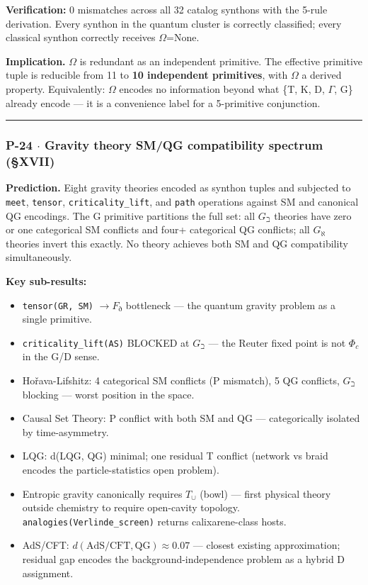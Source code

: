 \documentclass[12pt,a4paper]{article}
\begin{document}
\textbf{Verification:} 0 mismatches across all 32 catalog synthons with the 5-rule derivation. Every synthon in the quantum cluster is correctly classified; every classical synthon correctly receives $\Omega$=None.

\textbf{Implication.} $\Omega$ is redundant as an independent primitive. The effective primitive tuple is reducible from 11 to \textbf{10 independent primitives}, with $\Omega$ a derived property. Equivalently: $\Omega$ encodes no information beyond what \{T, K, D, $\Gamma$, G\} already encode --- it is a convenience label for a 5-primitive conjunction.

\begin{center}
\rule{0.5\textwidth}{0.4pt}
\end{center}

\subsubsection{P-24 $\cdot$ Gravity theory SM/QG compatibility spectrum (§XVII)}

\textbf{Prediction.} Eight gravity theories encoded as synthon tuples and subjected to \texttt{meet}, \texttt{tensor}, \texttt{criticality\_lift}, and \texttt{path} operations against SM and canonical QG encodings. The G primitive partitions the full set: all $G_{\beth}$ theories have zero or one categorical SM conflicts and four+ categorical QG conflicts; all $G_{\aleph}$ theories invert this exactly. No theory achieves both SM and QG compatibility simultaneously.

\textbf{Key sub-results:}

\begin{itemize}
    \item \texttt{tensor(GR, SM)} $\to F_{\eth}$ bottleneck --- the quantum gravity problem as a single primitive.
    \item \texttt{criticality\_lift(AS)} BLOCKED at $G_{\beth}$ --- the Reuter fixed point is not $\Phi_c$ in the G/D sense.
    \item Hořava-Lifshitz: 4 categorical SM conflicts (P mismatch), 5 QG conflicts, $G_{\beth}$ blocking --- worst position in the space.
    \item Causal Set Theory: P conflict with both SM and QG --- categorically isolated by time-asymmetry.
    \item LQG: d(LQG, QG) minimal; one residual T conflict (network vs braid encodes the particle-statistics open problem).
    \item Entropic gravity canonically requires $T_{\cup}$ (bowl) --- first physical theory outside chemistry to require open-cavity topology. \texttt{analogies(Verlinde\_screen)} returns calixarene-class hosts.
    \item AdS/CFT: $d(\text{AdS/CFT}, \text{QG}) \approx 0.07$ --- closest existing approximation; residual gap encodes the background-independence problem as a hybrid D assignment.
\end{itemize}
\end{document}
